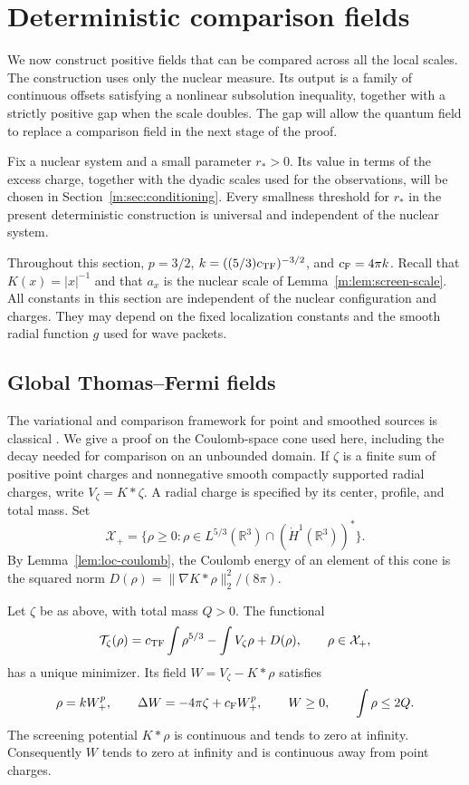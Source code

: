 \section{Deterministic comparison fields}\label{m:sec:barriers}

We now construct positive fields that can be compared across all the
local scales.  The construction uses only the nuclear measure.  Its
output is a family of continuous offsets satisfying a nonlinear
subsolution inequality, together with a strictly positive gap when the
scale doubles.  The gap will allow the quantum field to replace a
comparison field in the next stage of the proof.

Fix a nuclear system and a small parameter $r_*>0$.  Its value in terms
of the excess charge, together with the dyadic scales used for the
observations, will be chosen in Section~\ref{m:sec:conditioning}.
Every smallness threshold for $r_*$ in the present deterministic
construction is universal and independent of the nuclear system.

Throughout this section, $p=3/2$, $k=((5/3)c_{\mathrm{TF}})^{-3/2}$, and
$c_{\mathrm F}=4\pi k$.  Recall that $K(x)=|x|^{-1}$ and that $a_x$ is the nuclear
scale of Lemma~\ref{m:lem:screen-scale}.  All constants in this section are independent of the nuclear
configuration and charges.  They may depend on the fixed localization
constants and the smooth radial function $g$ used for wave packets.

\subsection{Global Thomas--Fermi fields}

The variational and comparison framework for point and smoothed
sources is classical
\citep[Theorems~II.14, II.17--II.18, and IV.7--IV.10]{LiebSimon1977}.
We give a proof on the Coulomb-space cone used here, including the decay
needed for comparison on an unbounded domain.  If $\zeta$ is a finite
sum of positive point charges and nonnegative smooth compactly supported
radial charges, write $V_\zeta=K*\zeta$.  A radial charge is specified by
its center, profile, and total mass.  Set
\[
 \mathcal X_+=\{\rho\ge0:\rho\in L^{5/3}(\mathbb R^3)
                  \cap(\dot H^1(\mathbb R^3))^*\}.
\]
By Lemma~\ref{lem:loc-coulomb}, the Coulomb energy of an element of this
cone is the squared norm
$D(\rho)=\|\nabla K*\rho\|_2^2/(8\pi)$.

\begin{lemma}\label{m:lem:barrier-global-tf}
Let $\zeta$ be as above, with total mass $Q>0$.  The functional
\[
 \mathcal T_\zeta(\rho)
   =c_{\mathrm{TF}}\int\rho^{5/3}-\int V_\zeta\rho+D(\rho),
       \qquad \rho\in\mathcal X_+,
\]
has a unique minimizer.  Its field $W=V_\zeta-K*\rho$ satisfies
\begin{equation}\label{m:eq:global-tf-equation}
 \rho=kW_+^p,\qquad
 \Delta W=-4\pi\zeta+c_{\mathrm F} W_+^p,\qquad
 W\ge0,\qquad \int\rho\le2Q.
\end{equation}
The screening potential $K*\rho$ is continuous and tends to zero at
infinity.  Consequently $W$ tends to zero at infinity and is continuous
away from point charges.
\end{lemma}

